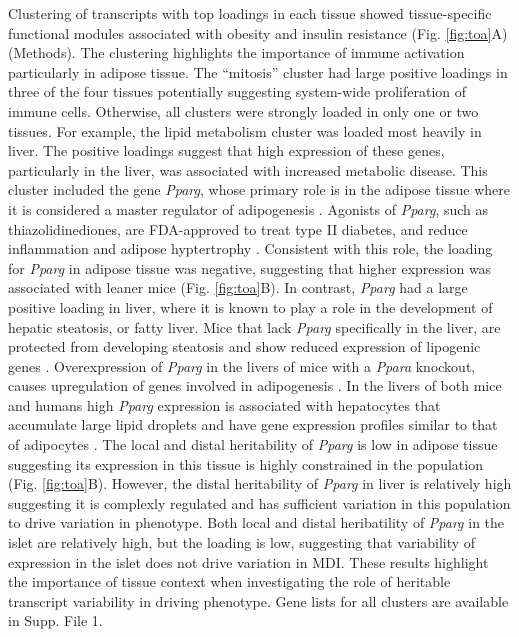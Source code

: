 \documentclass[
]{article}
\begin{document}
Clustering of transcripts with top loadings in each tissue showed
tissue-specific functional modules associated with obesity and insulin
resistance (Fig. \ref{fig:toa}A) (Methods). The clustering highlights
the importance of immune activation particularly in adipose tissue. The
``mitosis'' cluster had large positive loadings in three of the four
tissues potentially suggesting system-wide proliferation of immune
cells. Otherwise, all clusters were strongly loaded in only one or two
tissues. For example, the lipid metabolism cluster was loaded most
heavily in liver. The positive loadings suggest that high expression of
these genes, particularly in the liver, was associated with increased
metabolic disease. This cluster included the gene \textit{Pparg}, whose
primary role is in the adipose tissue where it is considered a master
regulator of adipogenesis \cite{pmid17389767}. Agonists of
\textit{Pparg}, such as thiazolidinediones, are FDA-approved to treat
type II diabetes, and reduce inflammation and adipose hyptertrophy
\cite{pmid17389767}. Consistent with this role, the loading for
\textit{Pparg} in adipose tissue was negative, suggesting that higher
expression was associated with leaner mice (Fig. \ref{fig:toa}B). In
contrast, \textit{Pparg} had a large positive loading in liver, where it
is known to play a role in the development of hepatic steatosis, or
fatty liver. Mice that lack \textit{Pparg} specifically in the liver,
are protected from developing steatosis and show reduced expression of
lipogenic genes \cite{pmid12805374, pmid12618528}. Overexpression of
\textit{Pparg} in the livers of mice with a \textit{Ppara} knockout,
causes upregulation of genes involved in adipogenesis
\cite{pmid16357043}. In the livers of both mice and humans high
\textit{Pparg} expression is associated with hepatocytes that accumulate
large lipid droplets and have gene expression profiles similar to that
of adipocytes \cite{pmid15644454, pmid16403437}. The local and distal
heritability of \textit{Pparg} is low in adipose tissue suggesting its
expression in this tissue is highly constrained in the population (Fig.
\ref{fig:toa}B). However, the distal heritability of \textit{Pparg} in
liver is relatively high suggesting it is complexly regulated and has
sufficient variation in this population to drive variation in phenotype.
Both local and distal heribatility of \textit{Pparg} in the islet are
relatively high, but the loading is low, suggesting that variability of
expression in the islet does not drive variation in MDI. These results
highlight the importance of tissue context when investigating the role
of heritable transcript variability in driving phenotype. Gene lists for
all clusters are available in Supp. File 1.
\end{document}
